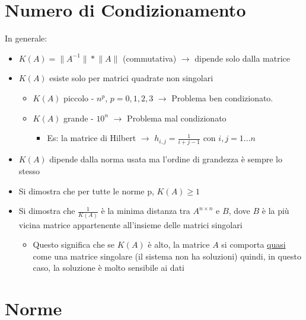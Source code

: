 \documentclass{article}
\newcommand\norm[1]{\lVert#1\rVert}	%
\begin{document}
	\section{Numero di Condizionamento}

		In generale:
		\begin{itemize}
			\item $K(A) = \norm{A^{-1}} * \norm{A}$ (commutativa) $\rightarrow$ dipende solo dalla matrice
			\item $K(A)$ esiste solo per matrici quadrate non singolari
			\begin{itemize}
				\item $K(A)$ piccolo - $n^p$, $p = 0, 1, 2, 3$ $\rightarrow$ Problema ben condizionato.
				\item $K(A)$ grande - $10^n$ $\rightarrow$ Problema mal condizionato
				\begin{itemize}
					\item Es: la matrice di Hilbert $\rightarrow$ $h_{i,j} = \frac{1}{i + j - 1}$ con $i, j = 1 ... n$
				\end{itemize}
			\end{itemize}
			\item $K(A)$ dipende dalla norma usata ma l'ordine di grandezza è sempre lo stesso
			\item Si dimostra che per tutte le norme p, $K(A) \geq 1$
			\item Si dimostra che $\frac{1}{K(A)}$ è la minima distanza tra $A^{n \times n}$ e $B$, dove $B$ è la più vicina matrice appartenente all'insieme delle matrici singolari
			\begin{itemize}
				\item Questo significa che se $K(A)$ è alto, la matrice $A$ si comporta \underline{quasi} come una matrice singolare (il sistema non ha soluzioni) quindi, in questo caso, la soluzione è molto sensibile ai dati
			\end{itemize}
		\end{itemize}

	\section{Norme}
\end{document}
